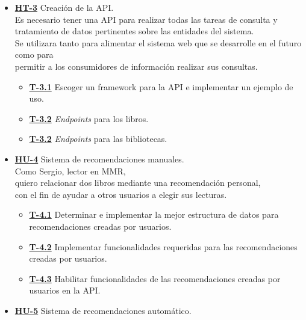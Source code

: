 \begin{itemize}
    \item \href{https://github.com/Anglepi/My-Many-Reads/issues/45}{\textbf{HT-3}} Creación de la API. \\
    Es necesario tener una API para realizar todas las tareas de consulta y tratamiento de datos pertinentes sobre las entidades del sistema. \\
    Se utilizara tanto para alimentar el sistema web que se desarrolle en el futuro como para \\
    permitir a los consumidores de información realizar sus consultas.
    \begin{itemize}
        \item \href{https://github.com/Anglepi/My-Many-Reads/issues/46}{\textbf{T-3.1}} Escoger un framework para la API e implementar un ejemplo de uso.
        \item \href{https://github.com/Anglepi/My-Many-Reads/issues/47}{\textbf{T-3.2}} \textit{Endpoints} para los libros.
        \item \href{https://github.com/Anglepi/My-Many-Reads/issues/48}{\textbf{T-3.2}} \textit{Endpoints} para las bibliotecas.
    \end{itemize}
    \item \href{https://github.com/Anglepi/My-Many-Reads/issues/49}{\textbf{HU-4}} Sistema de recomendaciones manuales. \\
    Como Sergio, lector en MMR, \\
    quiero relacionar dos libros mediante una recomendación personal, \\
    con el fin de ayudar a otros usuarios a elegir sus lecturas.
    \begin{itemize}
        \item \href{https://github.com/Anglepi/My-Many-Reads/issues/57}{\textbf{T-4.1}} Determinar e implementar la mejor estructura de datos para recomendaciones creadas por usuarios.
        \item \href{https://github.com/Anglepi/My-Many-Reads/issues/58}{\textbf{T-4.2}} Implementar funcionalidades requeridas para las recomendaciones creadas por usuarios.
        \item \href{https://github.com/Anglepi/My-Many-Reads/issues/59}{\textbf{T-4.3}} Habilitar funcionalidades de las recomendaciones creadas por usuarios en la API.
    \end{itemize}
    \item \href{https://github.com/Anglepi/My-Many-Reads/issues/50}{\textbf{HU-5}} Sistema de recomendaciones automático. \\

\end{itemize}
